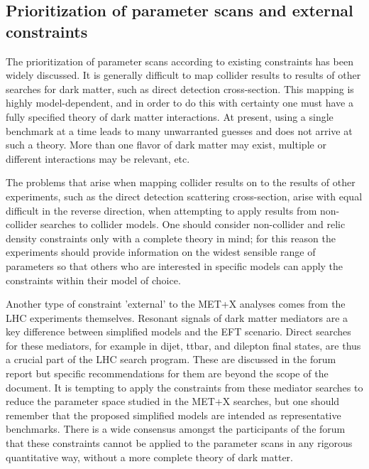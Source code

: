 \documentclass[a4,debug,notitlepage,nobib]{tufte-handout}
\begin{document}

\subsection{Prioritization of parameter scans and external constraints}

The prioritization of parameter scans according to existing constraints 
has been widely discussed. It is generally difficult to map
collider results to results of other searches for dark matter, such as
direct detection cross-section. This mapping is highly
model-dependent, and in order to do this with certainty one must have
a fully specified theory of dark matter interactions. At present,
using a single benchmark at a time leads to many unwarranted guesses
and does not arrive at such a theory.  More than one flavor of dark
matter may exist, multiple or different interactions may be relevant,
etc.

The problems that arise when mapping collider results on to the
results of other experiments, such as the direct detection scattering
cross-section, arise with equal difficult in the reverse direction,
when attempting to apply results from non-collider searches to
collider models. One should consider non-collider and relic density
constraints only with a complete theory in mind; for this reason the
experiments should provide information on the widest sensible range of
parameters so that others who are interested in specific models can
apply the constraints within their model of choice.

Another type of constraint 'external' to the MET+X analyses comes from
the LHC experiments themselves. Resonant signals of dark matter
mediators are a key difference between simplified models and the EFT
scenario. Direct searches for these mediators, for example in dijet,
ttbar, and dilepton final states, are thus a crucial part of the LHC
search program. These are discussed in the forum report but specific
recommendations for them are beyond the scope of the document.  It is
tempting to apply the constraints from these mediator searches to
reduce the parameter space studied in the MET+X searches, but one
should remember that the proposed simplified models are intended as
representative benchmarks. There is a wide consensus amongst the
participants of the forum that these constraints cannot be applied to
the parameter scans in any rigorous quantitative way, without a more
complete theory of dark matter.
\end{document}
